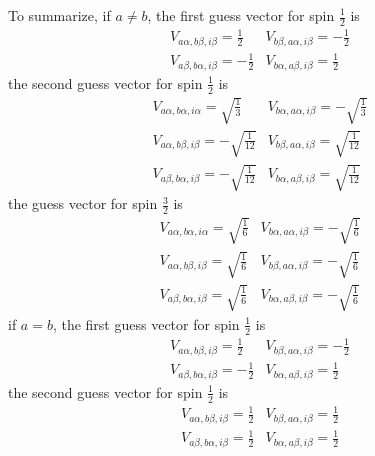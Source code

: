 To summarize, if $a \neq b$, the first guess vector for spin $\frac{1}{2}$ is
\begin{equation}
	\begin{array}{ll}
		V_{a \alpha, b \beta, i \beta}=\frac{1}{2} & V_{b \beta, a \alpha, i \beta}=-\frac{1}{2} 
		\\
		V_{a \beta, b \alpha, i \beta}=-\frac{1}{2} & V_{b \alpha, a \beta, i \beta}=\frac{1}{2} 
	\end{array}
\end{equation}
the second guess vector for spin $\frac{1}{2}$ is 
\begin{equation}
	\begin{array}{ll}
		V_{a \alpha, b \alpha, i \alpha}=\sqrt{\frac{1}{3}} & V_{b \alpha, a \alpha, i \beta}=-\sqrt{\frac{1}{3}} 
		\\
		V_{a \alpha, b \beta, i \beta}=-\sqrt{\frac{1}{12}} & V_{b \beta, a \alpha, i \beta}=\sqrt{\frac{1}{12}} 
		\\
		V_{a \beta, b \alpha, i \beta}=-\sqrt{\frac{1}{12}} & V_{b \alpha, a \beta, i \beta}=\sqrt{\frac{1}{12}} 
	\end{array}
\end{equation}
the guess vector for spin $\frac{3}{2}$ is
\begin{equation}
	\begin{array}{ll}
		V_{a \alpha, b \alpha, i \alpha}=\sqrt{\frac{1}{6}} & V_{b \alpha, a \alpha, i \beta}=-\sqrt{\frac{1}{6}} 
		\\
		V_{a \alpha, b \beta, i \beta}=\sqrt{\frac{1}{6}} & V_{b \beta, a \alpha, i \beta}=-\sqrt{\frac{1}{6}} 
		\\
		V_{a \beta, b \alpha, i \beta}=\sqrt{\frac{1}{6}} & V_{b \alpha, a \beta, i \beta}=-\sqrt{\frac{1}{6}} 
	\end{array}
\end{equation}
if $a=b$, the first guess vector for spin $\frac{1}{2}$ is
\begin{equation}
	\begin{array}{ll}
		V_{a \alpha, b \beta, i \beta}=\frac{1}{2} & V_{b \beta, a \alpha, i \beta}=-\frac{1}{2} 
		\\
		V_{a \beta, b \alpha, i \beta}=-\frac{1}{2} & V_{b \alpha, a \beta, i \beta}=\frac{1}{2} 
	\end{array}
\end{equation}
the second guess vector for spin $\frac{1}{2}$ is 
\begin{equation}
	\begin{array}{ll}
		V_{a \alpha, b \beta, i \beta}=\frac{1}{2} & V_{b \beta, a \alpha, i \beta}=\frac{1}{2} 
		\\
		V_{a \beta, b \alpha, i \beta}=\frac{1}{2} & V_{b \alpha, a \beta, i \beta}=\frac{1}{2} 
	\end{array}
\end{equation}

